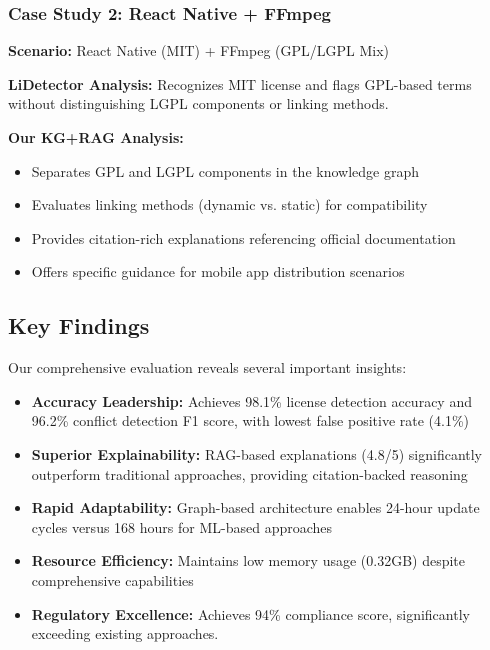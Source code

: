 \documentclass[9pt,twocolumn]{article}
\begin{document}
\subsubsection{Case Study 2: React Native + FFmpeg}
\textbf{Scenario:} React Native (MIT) + FFmpeg (GPL/LGPL Mix)

\textbf{LiDetector Analysis:} Recognizes MIT license and flags GPL-based terms without distinguishing LGPL components or linking methods.

\textbf{Our KG+RAG Analysis:}
\begin{itemize}
    \item Separates GPL and LGPL components in the knowledge graph
    \item Evaluates linking methods (dynamic vs. static) for compatibility
    \item Provides citation-rich explanations referencing official documentation
    \item Offers specific guidance for mobile app distribution scenarios
\end{itemize}

\subsection{Key Findings}
Our comprehensive evaluation reveals several important insights:

\begin{itemize}
    \item \textbf{Accuracy Leadership:} Achieves 98.1\% license detection accuracy and 96.2\% conflict detection F1 score, with lowest false positive rate (4.1\%)
    \item \textbf{Superior Explainability:} RAG-based explanations (4.8/5) significantly outperform traditional approaches, providing citation-backed reasoning
    \item \textbf{Rapid Adaptability:} Graph-based architecture enables 24-hour update cycles versus 168 hours for ML-based approaches
    \item \textbf{Resource Efficiency:} Maintains low memory usage (0.32GB) despite comprehensive capabilities
    \item \textbf{Regulatory Excellence:} Achieves 94\% compliance score, significantly exceeding existing approaches.
\end{itemize}
\end{document}
